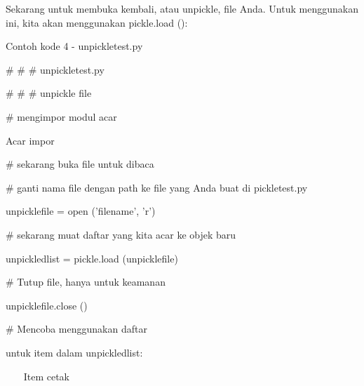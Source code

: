 Sekarang untuk membuka kembali, atau unpickle, file Anda. Untuk menggunakan ini, kita akan menggunakan pickle.load (): \par
Contoh kode 4 - unpickletest.py \par
\vspace{12pt}
\noindent 
$  \#  $ $  \#  $ $  \#  $ unpickletest.py \par
\noindent 
$  \#  $ $  \#  $ $  \#  $ unpickle file \par
\vspace{12pt}
\noindent 
$  \#  $ mengimpor modul acar \par
\noindent 
Acar impor \par
\vspace{12pt}
\noindent 
$  \#  $ sekarang buka file untuk dibaca \par
\noindent 
$  \#  $ ganti nama file dengan path ke file yang Anda buat di pickletest.py \par
\noindent 
unpicklefile = open ('filename', 'r') \par
\vspace{12pt}
\noindent 
$  \#  $ sekarang muat daftar yang kita acar ke objek baru \par
\noindent 
unpickledlist = pickle.load (unpicklefile) \par
\vspace{12pt}
\noindent 
$  \#  $ Tutup file, hanya untuk keamanan \par
\noindent 
unpicklefile.close () \par
\vspace{12pt}
\noindent 
$  \#  $ Mencoba menggunakan daftar \par
\noindent 
untuk item dalam unpickledlist: \par
\noindent 
~~~ Item cetak \par
\vspace{12pt}

